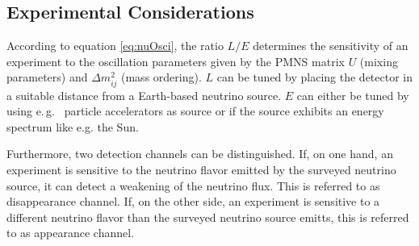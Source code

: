 \subsection{Experimental Considerations}
\label{sec:neutrinoPhysicsOscillationsExpConsiderations}
According to equation \eqref{eq:nuOsci}, the ratio $L/E$ determines the sensitivity of an experiment to the oscillation parameters given by the PMNS matrix $U$ (mixing parameters) and $\Delta m^2_{ij}$ (mass ordering). $L$ can be tuned by placing the detector in a suitable distance from a Earth-based neutrino source. $E$ can either be tuned by using e.\,g.~ particle accelerators as source or if the source exhibits an energy spectrum like e.g. the Sun. 

Furthermore, two detection channels can be distinguished. If, on one hand, an experiment is sensitive to the neutrino flavor emitted by the surveyed neutrino source, it can detect a weakening of the neutrino flux. This is referred to as disappearance channel. If, on the other side, an experiment is sensitive to a different neutrino flavor than the surveyed neutrino source emitts, this is referred to as appearance channel.

